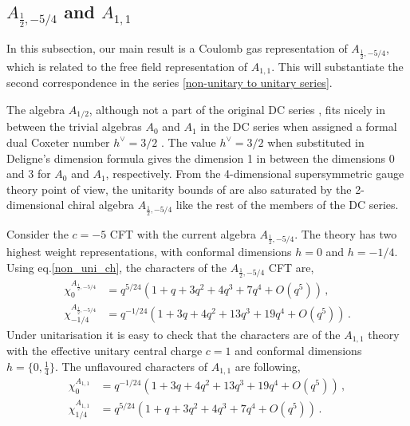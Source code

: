 \documentclass[a4paper,12pt]{article}
\begin{document}

\subsection{\ensuremath{A_{\frac{1}{2},-5/4}} and \ensuremath{A_{1,1}} }
In this subsection, our main result is a Coulomb gas representation of $A_{\frac{1}{2},-5/4}$, which is related to the free field representation of $A_{1,1}$. This will substantiate the second correspondence in the series \eqref{non-unitary to unitary series}.

The algebra $A_{1/2}$, although not a part of the original DC series \cite{deligne1996serie,Cvitanovic:2008zz}, fits nicely in between the trivial algebras $A_0$ and $A_1$ in the DC series when assigned a formal dual Coxeter number $h^\vee=3/2$ \cite{2cf0314cf8fd4509a1f3b973a384ae12}. The value $h^\vee=3/2$ when substituted in Deligne's dimension formula gives the dimension 1 in between the dimensions 0 and 3 for $A_0$ and $A_1$, respectively. From the 4-dimensional supersymmetric gauge theory point of view, the unitarity bounds of \cite{Beem:2013sza, Lemos:2015orc, Beem:2017ooy} are also saturated by the 2-dimensional chiral algebra $A_{\frac{1}{2},-5/4}$ like the rest of the members of the DC series.

Consider the $c=-5$ CFT with the current algebra $A_{\frac{1}{2},-5/4}$. The theory has two highest weight representations, with conformal dimensions $h=0$ and $h=-1/4$. Using eq.\eqref{non_uni_ch}, the characters of the $A_{\frac{1}{2},-5/4}$ CFT are,
%
\begin{align}\label{a1/2-chars}
    \chi_{0}^{A_{\frac{1}{2},-5/4}}&=q^{5/24}(1+q+3q^2+4q^3+7q^4+\textit{O}(q^5))\, ,\nonumber\\
    \chi_{-1/4}^{A_{\frac{1}{2},-5/4}}&=q^{-1/24}(1+3q+4q^2+13q^3+19q^4+\textit{O}(q^5))\, .
\end{align}
%
Under unitarisation it is easy to check that the characters are of the $A_{1,1}$ theory with the effective unitary central charge $c=1$ and conformal dimensions $h=\{0,\frac{1}{4}\}$. The unflavoured characters of $A_{1,1}$ are following,
%
\begin{align}\label{a1/2-chars-exchanged}
    \chi_{0}^{A_{1,1}}&=q^{-1/24}(1+3q+4q^2+13q^3+19q^4+\textit{O}(q^5))\, ,\nonumber\\
    \chi_{1/4}^{A_{1,1}}&=q^{5/24}(1+q+3q^2+4q^3+7q^4+\textit{O}(q^5))\, .
\end{align}
%
\end{document}
